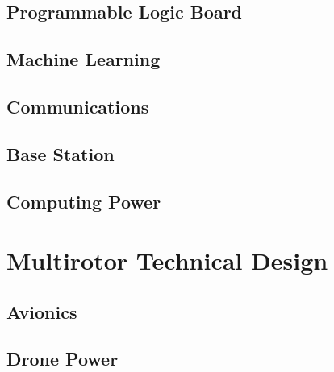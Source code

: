 \documentclass[10pt,letterpaper]{article}
\begin{document}
\subsection{Programmable Logic Board}\label{programmable_logic}


\subsection{Machine Learning}\label{machine_learning}


\subsection{Communications}\label{communications}


\subsection{Base Station}\label{base_station}


\subsection{Computing Power}\label{computing_power}


\section{Multirotor Technical Design}\label{multirotor}
\subsection{Avionics}\label{avionics}


\subsection{Drone Power}\label{drone_power}


\clearpage
{}



\end{document}
